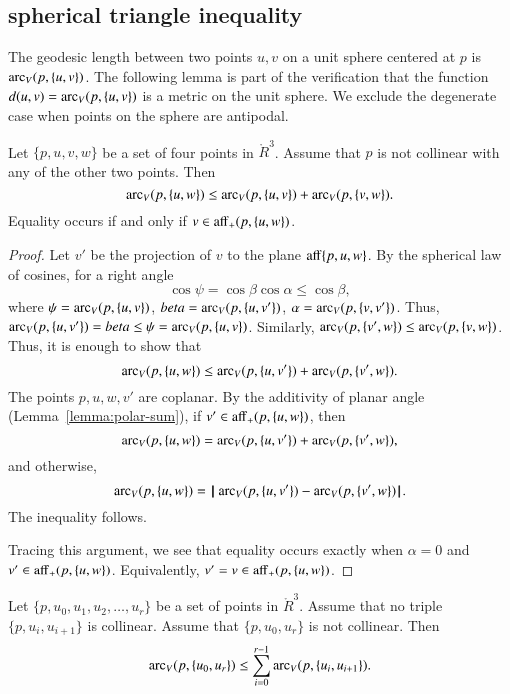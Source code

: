 





\subsection{spherical triangle inequality}

The geodesic length between two points
$u,v$ on a unit sphere centered at $p$ is $\operatorname{arc}_V(p,\{u,v\})$.
The following lemma is part of the verification that
the function $d(u,v) = \operatorname{arc}_V(p,\{u,v\})$ is a metric
on the unit sphere.  We exclude the degenerate case when
points on the sphere are antipodal.

\begin{lemma}\label{lemma:sph-tri-ineq}
Let $\{p,u,v,w\}$ be a set of four points in $\ring{R}^3$.
Assume that $p$ is not collinear with any of the other two points.
Then
   $$
   \operatorname{arc}_V(p,\{u,w\}) \le \operatorname{arc}_V(p,\{u,v\}) + \operatorname{arc}_V(p,\{v,w\}).
   $$
Equality occurs if and only if $v\in{\operatorname{aff}}_+(p,\{u,w\})$.
\end{lemma}

\begin{proof} Let $v'$ be the projection of $v$ to the plane
${\operatorname{aff}}\{p,u,w\}$.  
By the spherical law of cosines, for a right angle
   $$
   \cos\psi = \cos\beta\cos\alpha \le \cos\beta,
   $$
where $\psi = \operatorname{arc}_V(p,\{u,v\})$, $beta = \operatorname{arc}_V(p,\{u,v'\})$, $\alpha=\operatorname{arc}_V(p,\{v,v'\})$.
Thus, $\operatorname{arc}_V(p,\{u,v'\})=beta\le \psi=\operatorname{arc}_V(p,\{u,v\})$.
Similarly, $\operatorname{arc}_V(p,\{v',w\}) \le \operatorname{arc}_V(p,\{v,w\})$.
Thus, it is enough to show that 
  $$
  \operatorname{arc}_V(p,\{u,w\}) \le \operatorname{arc}_V(p,\{u,v'\}) + \operatorname{arc}_V(p,\{v',w\}).
  $$
The points $p,u,w,v'$ are coplanar.
By the additivity of planar angle (Lemma~\ref{lemma:polar-sum}), if 
$v'\in {\operatorname{aff}}_+(p,\{u,w\})$, then
   $$
   \operatorname{arc}_V(p,\{u,w\}) = \operatorname{arc}_V(p,\{u,v'\}) + \operatorname{arc}_V(p,\{v',w\}),   
   $$
and otherwise,
   $$
   \operatorname{arc}_V(p,\{u,w\}) = {\hskip0.1em|\hskip-0.15em|\hskip0.1em}\operatorname{arc}_V(p,\{u,v'\})  -  \operatorname{arc}_V(p,\{v',w\}){\hskip0.1em|\hskip-0.15em|\hskip0.1em}.
   $$
The inequality follows.

Tracing this argument, we see that equality occurs exactly when
$\alpha=0$ and $v'\in {\operatorname{aff}}_+(p,\{u,w\})$.  Equivalently,
$v'=v\in{\operatorname{aff}}_+(p,\{u,w\})$.
\end{proof}

\begin{lemma}
\label{lemma:sph-tri-multi}
Let $\{p,u_0,u_1,u_2,\ldots,u_r\}$ be a set of points in $\ring{R}^3$.
Assume that no triple $\{p,u_i,u_{i+1}\}$ is collinear.  Assume
that $\{p,u_0,u_r\}$ is not collinear.  Then
$$
  \operatorname{arc}_V(p,\{u_0,u_r\}) \le \sum_{i=0}^{r-1} \operatorname{arc}_V(p,\{u_i,u_{i+1}\}).
$$
\end{lemma}

